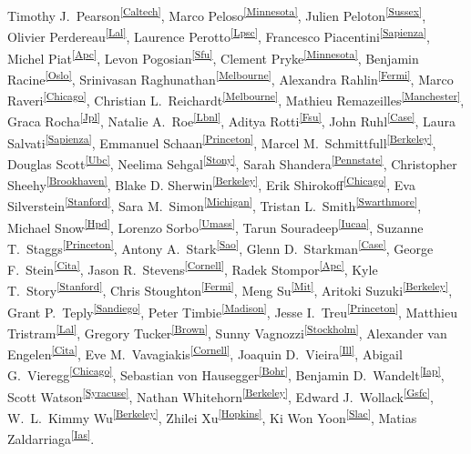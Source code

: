 Timothy J.~Pearson\textsuperscript{\ref{Caltech}},
Marco Peloso\textsuperscript{\ref{Minnesota}},
Julien Peloton\textsuperscript{\ref{Sussex}},
Olivier Perdereau\textsuperscript{\ref{Lal}},
Laurence Perotto\textsuperscript{\ref{Lpsc}},
Francesco Piacentini\textsuperscript{\ref{Sapienza}},
Michel Piat\textsuperscript{\ref{Apc}},
Levon Pogosian\textsuperscript{\ref{Sfu}},
Clement Pryke\textsuperscript{\ref{Minnesota}},
Benjamin Racine\textsuperscript{\ref{Oslo}},
Srinivasan Raghunathan\textsuperscript{\ref{Melbourne}},
Alexandra Rahlin\textsuperscript{\ref{Fermi}},
Marco Raveri\textsuperscript{\ref{Chicago}},
Christian L.~Reichardt\textsuperscript{\ref{Melbourne}},
Mathieu Remazeilles\textsuperscript{\ref{Manchester}},
Graca Rocha\textsuperscript{\ref{Jpl}},
Natalie A.~Roe\textsuperscript{\ref{Lbnl}},
Aditya Rotti\textsuperscript{\ref{Fsu}},
John Ruhl\textsuperscript{\ref{Case}},
Laura Salvati\textsuperscript{\ref{Sapienza}},
Emmanuel Schaan\textsuperscript{\ref{Princeton}},
Marcel M.~Schmittfull\textsuperscript{\ref{Berkeley}},
Douglas Scott\textsuperscript{\ref{Ubc}},
Neelima Sehgal\textsuperscript{\ref{Stony}},
Sarah Shandera\textsuperscript{\ref{Pennstate}},
Christopher Sheehy\textsuperscript{\ref{Brookhaven}},
Blake D. Sherwin\textsuperscript{\ref{Berkeley}},
Erik Shirokoff\textsuperscript{\ref{Chicago}},
Eva Silverstein\textsuperscript{\ref{Stanford}},
Sara M.~Simon\textsuperscript{\ref{Michigan}},
Tristan L.~Smith\textsuperscript{\ref{Swarthmore}},
Michael Snow\textsuperscript{\ref{Hpd}},
Lorenzo Sorbo\textsuperscript{\ref{Umass}},
Tarun Souradeep\textsuperscript{\ref{Iucaa}},
Suzanne T.~Staggs\textsuperscript{\ref{Princeton}},
Antony A.~Stark\textsuperscript{\ref{Sao}},
Glenn D.~Starkman\textsuperscript{\ref{Case}},
George F.~Stein\textsuperscript{\ref{Cita}},
Jason R.~Stevens\textsuperscript{\ref{Cornell}},
Radek Stompor\textsuperscript{\ref{Apc}},
Kyle T.~Story\textsuperscript{\ref{Stanford}},
Chris Stoughton\textsuperscript{\ref{Fermi}},
Meng Su\textsuperscript{\ref{Mit}},
Aritoki Suzuki\textsuperscript{\ref{Berkeley}},
Grant P.~Teply\textsuperscript{\ref{Sandiego}},
Peter Timbie\textsuperscript{\ref{Madison}},
Jesse I.~Treu\textsuperscript{\ref{Princeton}},
Matthieu Tristram\textsuperscript{\ref{Lal}},
Gregory Tucker\textsuperscript{\ref{Brown}},
Sunny Vagnozzi\textsuperscript{\ref{Stockholm}},
Alexander van Engelen\textsuperscript{\ref{Cita}},
Eve M.~Vavagiakis\textsuperscript{\ref{Cornell}},
Joaquin D.~Vieira\textsuperscript{\ref{Ill}},
Abigail G.~Vieregg\textsuperscript{\ref{Chicago}}, 
Sebastian von Hausegger\textsuperscript{\ref{Bohr}},
Benjamin D.~Wandelt\textsuperscript{\ref{Iap}},
Scott Watson\textsuperscript{\ref{Syracuse}},
Nathan Whitehorn\textsuperscript{\ref{Berkeley}},
Edward J.~Wollack\textsuperscript{\ref{Gsfc}},
W.~L.~Kimmy Wu\textsuperscript{\ref{Berkeley}},
Zhilei Xu\textsuperscript{\ref{Hopkins}},
Ki Won Yoon\textsuperscript{\ref{Slac}},
Matias Zaldarriaga\textsuperscript{\ref{Ias}}.

